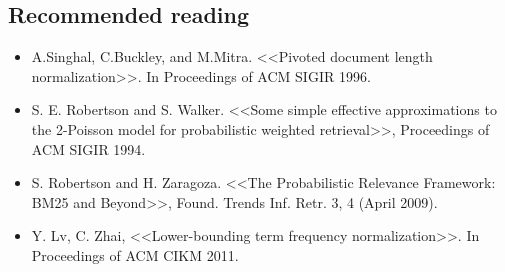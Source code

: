 \subsection{Recommended reading}
\begin{itemize}
\item A.Singhal, C.Buckley, and M.Mitra. <<Pivoted document length normalization>>. In Proceedings of ACM SIGIR 1996.
\item S. E. Robertson and S. Walker. <<Some simple effective approximations to the 2-Poisson model for probabilistic weighted retrieval>>, Proceedings of ACM SIGIR 1994.
\item S. Robertson and H. Zaragoza. <<The Probabilistic Relevance Framework: BM25 and Beyond>>, Found. Trends Inf. Retr. 3, 4 (April 2009).
\item Y. Lv, C. Zhai, <<Lower-bounding term frequency normalization>>. In Proceedings of ACM CIKM 2011.
\end{itemize}

